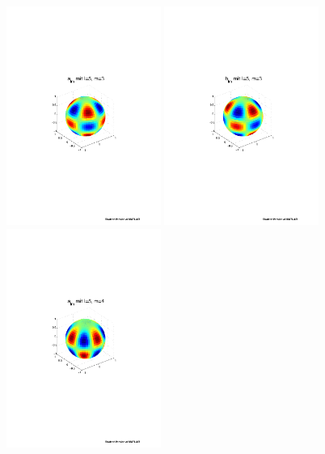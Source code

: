 \begin{refsection}
\begin{figure}%
\centering
\includegraphics[width=0.45\textwidth]{kugel/ylm/a_5_3.pdf}
\includegraphics[width=0.45\textwidth]{kugel/ylm/b_5_3.pdf}
\includegraphics[width=0.45\textwidth]{kugel/ylm/a_5_4.pdf}

\end{figure}
\end{refsection}

